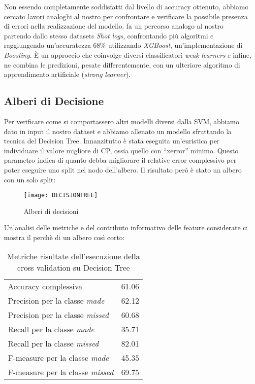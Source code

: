 \par
Non essendo completamente soddisfatti dal livello di accuracy ottenuto, abbiamo cercato lavori analoghi al nostro per confrontare e verificare la possibile presenza di errori nella realizzazione del modello. \cite{predictingNBAst} fa un percorso analogo al nostro partendo dallo stesso datasets \textit{Shot logs}, confrontando più algoritmi e raggiungendo un'accuratezza  68\% utilizzando \textit{XGBoost}, un'implementazione di \textit{Boosting}. È un approccio che coinvolge diversi classificatori \textit{weak learners} e infine, ne combina le predizioni, pesate differentemente, con un ulteriore algoritmo di apprendimento artificiale (\textit{strong learner}).

\subsection{Alberi di Decisione}
Per verificare come si comportassero altri modelli diversi dalla SVM, abbiamo dato in input il nostro dataset e abbiamo allenato un modello sfruttando la tecnica del Decision Tree.
Innanzitutto è stata eseguita un’euristica per individuare il valore migliore di CP, ossia quello con “xerror” minimo. Questo parametro indica di quanto debba migliorare il relative error complessivo per poter eseguire uno split nel nodo dell'albero.
Il risultato però è stato un albero con un solo split:

\begin{figure}
\caption{Alberi di decisioni}
\label{dt_fig}
  \texttt{[image: DECISIONTREE]}
\end{figure}


Un’analisi delle metriche e del contributo informativo delle feature considerate ci mostra il perchè di un albero così corto:


\begin{table}[h!]
\centering
  \begin{tabular}{l l} 
  Accuracy complessiva & 61.06\\
  Precision per la classe \textit{made} & 62.12\\
  Precision per la classe \textit{missed} & 60.68\\
  Recall per la classe \textit{made} & 35.71\\
  Recall per la classe \textit{missed} & 82.01\\
  F-measure per la classe \textit{made} & 45.35\\
  F-measure per la classe \textit{missed} & 69.75\\
    \end{tabular}
    \caption{Metriche risultate dell'esecuzione della cross validation su Decision Tree}
\end{table}

